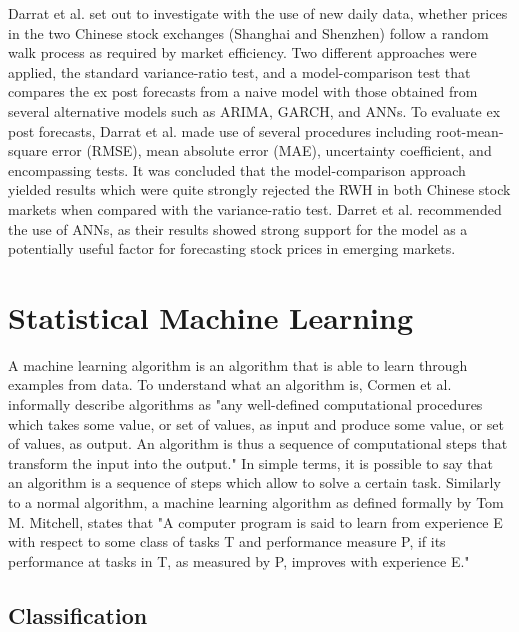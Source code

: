 Darrat et al. set out to investigate with the use of new daily data, whether prices in the two Chinese stock exchanges (Shanghai and Shenzhen) follow a random walk process as required by market efficiency.\cite{Darrat:2001aa} Two different approaches were applied, the standard variance-ratio test, and a model-comparison test that compares the ex post forecasts from a naive model with those obtained from several alternative models such as ARIMA, GARCH, and ANNs. To evaluate ex post forecasts, Darrat et al. made use of several procedures including root-mean-square error (RMSE), mean absolute error (MAE), uncertainty coefficient, and encompassing tests. It was concluded that the model-comparison approach yielded results which were quite strongly rejected the RWH in both Chinese stock markets when compared with the variance-ratio test. Darret et al. recommended the use of ANNs, as their results showed strong support for the model as a potentially useful factor for forecasting stock prices in emerging markets.

\section{Statistical Machine Learning}

A machine learning algorithm is an algorithm that is able to learn through examples from data. To understand what an algorithm is, Cormen et al. informally describe algorithms as "any well-defined computational procedures which takes some value, or set of values, as input and produce some value, or set of values, as output. An algorithm is thus a sequence of computational steps that transform the input into the output."\cite{Cormen:2009aa} In simple terms, it is possible to say that an algorithm is a sequence of steps which allow to solve a certain task. Similarly to a normal algorithm, a machine learning algorithm as defined formally by Tom M. Mitchell, states that "A computer program is said to learn from experience E with respect to some class of tasks T and performance measure P, if its performance at tasks in T, as measured by P, improves with experience E."\cite{Mitchell:1997aa}

\subsection{Classification}

